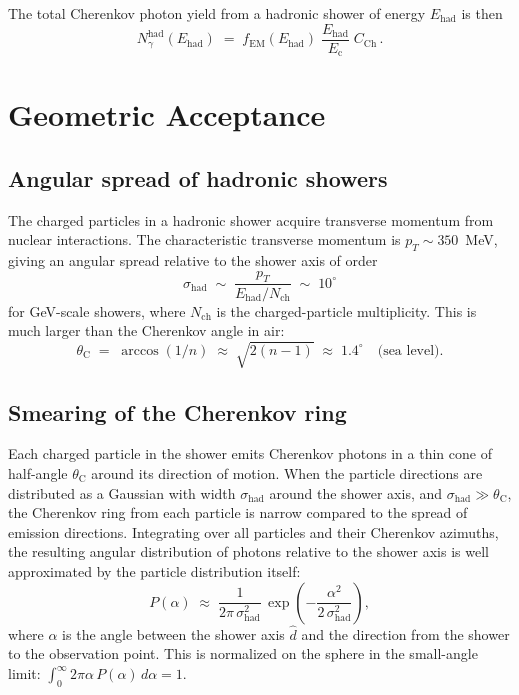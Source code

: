 \documentclass[11pt]{article}
\newcommand{\Ec}{E_{\mathrm{c}}}
\newcommand{\Ehad}{E_{\mathrm{had}}}
\newcommand{\fEM}{f_{\mathrm{EM}}}
\newcommand{\CCH}{C_{\mathrm{Ch}}}
\newcommand{\shad}{\sigma_{\mathrm{had}}}
\newcommand{\thetaC}{\theta_{\mathrm{C}}}
\begin{document}
The total Cherenkov photon yield from a hadronic shower of energy
$\Ehad$ is then
\begin{equation}
  N_{\gamma}^{\mathrm{had}}(\Ehad)
  \;=\;
  \fEM(\Ehad)\;\frac{\Ehad}{\Ec}\;\CCH\,.
  \label{eq:Nph_had}
\end{equation}

\section{Geometric Acceptance}
\label{sec:geometry}

\subsection{Angular spread of hadronic showers}

The charged particles in a hadronic shower acquire transverse momentum
from nuclear interactions.  The characteristic transverse momentum is
$p_T \sim 350$~MeV, giving an angular spread relative to the shower
axis of order
\begin{equation}
  \shad \;\sim\; \frac{p_T}{\Ehad / N_{\mathrm{ch}}}
  \;\sim\; 10^\circ
\end{equation}
for GeV-scale showers, where $N_{\mathrm{ch}}$ is the charged-particle
multiplicity.  This is much larger than the Cherenkov angle in air:
\begin{equation}
  \thetaC \;=\; \arccos(1/n) \;\approx\;
  \sqrt{2(n-1)} \;\approx\; 1.4^\circ
  \quad\text{(sea level)}.
\end{equation}

\subsection{Smearing of the Cherenkov ring}

Each charged particle in the shower emits Cherenkov photons in a thin
cone of half-angle $\thetaC$ around its direction of motion.  When the
particle directions are distributed as a Gaussian with width $\shad$
around the shower axis, and $\shad \gg \thetaC$, the Cherenkov ring
from each particle is narrow compared to the spread of emission
directions.  Integrating over all particles and their Cherenkov
azimuths, the resulting angular distribution of photons relative to the
shower axis is well approximated by the particle distribution itself:
\begin{equation}
  P(\alpha) \;\approx\;
  \frac{1}{2\pi\,\shad^2}\,
  \exp\!\left(-\frac{\alpha^2}{2\,\shad^2}\right),
  \label{eq:P_alpha}
\end{equation}
where $\alpha$ is the angle between the shower axis $\hat{d}$ and the
direction from the shower to the observation point.  This is normalized
on the sphere in the small-angle limit:
$\int_0^\infty 2\pi\alpha\, P(\alpha)\,d\alpha = 1$.
\end{document}
